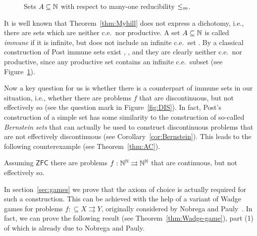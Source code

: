 \documentclass{amsart}
\def\IN{{\Bbb{N}}}
\def\In{\subseteq}
\def\mto{\rightrightarrows}
\def\K{{\mathsf{{K}}}}
\def\ZFC{\mathsf{ZFC}}
\begin{document}
\begin{figure}
\caption{Sets $A\In\IN$ with respect to many-one reducibility $\leq_{\rm m}$.} 
\label{fig:productive}
\end{figure}

It is well known that Theorem~\ref{thm:Myhill} does not express a dichotomy, i.e., there are sets which are
neither c.e.\ nor productive.
A set $A\In\IN$ is called {\em immune} if it is infinite, but does not include an infinite c.e.\ set \cite{Soa16,Wei87}.
By a classical construction of Post immune sets exist \cite{Pos44}, \cite[Theorem~5.2.3]{Soa16}, \cite[Theorem~2.3.7]{Wei87} and they are clearly neither c.e.\ nor productive, since any productive set contains an infinite c.e.\ subset (see Figure~\ref{fig:productive}).

Now a key question for us is whether there is a counterpart of immune sets in our situation, i.e., whether there are problems $f$
that are discontinuous, but not effectively so (see the question mark in Figure~\ref{fig:DIS}).
In fact, Post's construction of a simple set has some similarity to the construction of so-called {\em Bernstein sets} that can actually be used to construct discontinuous problems that are not effectively discontinuous (see Corollary~\ref{cor:Bernstein}).
This leads to the following counterexample (see Theorem~\ref{thm:AC}).

\begin{theorem} 
Assuming $\ZFC$ there are problems $f:\IN^\IN\mto\IN^\IN$ that are continuous, but not effectively so.
\end{theorem}

In section~\ref{sec:games} we prove that the axiom of choice is actually required for such a construction.
This can be achieved with the help of a variant of Wadge games for problems $f:\In X\mto Y$, originally
considered by Nobrega and Pauly~\cite{Nob18,NP19}. In fact, we can prove the following result (see Theorem~\ref{thm:Wadge-game}),
part (1) of which is already due to Nobrega and Pauly.
\end{document}
